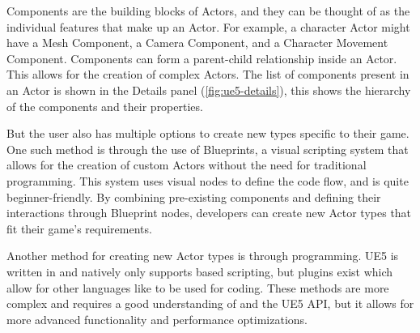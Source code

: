 Components are the building blocks of Actors, and they can be thought of as the individual features that make up an Actor. For example, a character Actor might have a Mesh Component, a Camera Component, and a Character Movement Component. Components can form a parent-child relationship inside an Actor. This allows for the creation of complex Actors. The list of components present in an Actor is shown in the Details panel (\autoref{fig:ue5-details}), this shows the hierarchy of the components and their properties.

But the user also has multiple options to create new types specific to their game. One such method is through the use of Blueprints, a visual scripting system that allows for the creation of custom Actors without the need for traditional programming. This system uses visual nodes to define the code flow, and is quite beginner-friendly. By combining pre-existing components and defining their interactions through Blueprint nodes, developers can create new Actor types that fit their game's requirements.

Another method for creating new Actor types is through \Cpp programming.
UE5 is written in \Cpp and natively only supports \Cpp based scripting, but plugins exist which allow for other languages like \Csh to be used for coding. These methods are more complex and requires a good understanding of \Cpp and the UE5 API, but it allows for more advanced functionality and performance optimizations.

